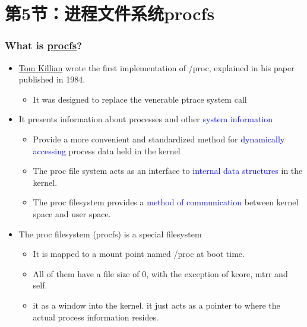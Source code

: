 \section{第5节：进程文件系统procfs}
% 
\begin{frame}[fragile]
    \frametitle{What is \href{https://en.wikipedia.org/wiki/Procfs}{procfs}?}


    \begin{itemize}
        \item \href{http://dtrace.org/blogs/eschrock/2004/06/25/a-brief-history-of-proc/}{Tom Killian} wrote the first implementation of /proc, explained in his paper published in 1984.
	    \begin{itemize}
	        \item It was designed to replace the venerable ptrace system call
      \end{itemize} \pause
        \item It presents information about processes and other \textcolor{blue}{system information}
	    \begin{itemize}
	        \item Provide a more convenient and standardized method for \textcolor{blue}{dynamically accessing} process data held in the kernel
          \item The proc file system acts as an interface to \textcolor{blue}{internal data structures} in the kernel.
          \item The proc filesystem provides a \textcolor{blue}{method of communication} between kernel space and user space.
      \end{itemize} \pause
        \item The proc filesystem (procfs) is a special filesystem
	    \begin{itemize}
	        \item It is mapped to a mount point named /proc at boot time.
          \item All of them have a file size of 0, with the exception of kcore, mtrr  and self.
          \item it as a window into the kernel. it just acts as a pointer to where the actual  process information resides.
      \end{itemize}
    \end{itemize}
% 
\end{frame}
